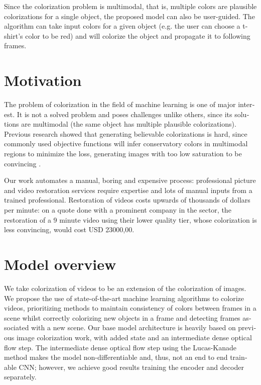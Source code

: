 \documentclass[12pt,openright,oneside,a4paper,english]{abntex2}
\begin{document}
\begin{otherlanguage}{english}
Since the colorization problem is multimodal, that is, multiple colors are plausible colorizations for a single object, the proposed model can also be user-guided. The algorithm can take input colors for a given object (e.g. the user can choose a t-shirt's color to be red) and will colorize the object and propagate it to following frames.

\section{Motivation} \label{sec:Motivation}
The problem of colorization in the field of machine learning is one of major interest. It is not a solved problem and poses challenges unlike others, since its solutions are multimodal (the same object has multiple plausible colorizations). Previous research showed that generating believable colorizations is hard, since commonly used objective functions will infer conservatory colors in multimodal regions to minimize the loss, generating images with too low saturation to be convincing \cite{colorful}.

Our work automates a manual, boring and expensive process: professional picture and video restoration services require expertise and lots of manual inputs from a trained professional. Restoration of videos costs upwards of thousands of dollars per minute: on a quote done with a prominent company in the sector, the restoration of a 9 minute video using their lower quality tier, whose colorization is less convincing, would cost USD 23000,00.

\section{Model overview}

We take colorization of videos to be an extension of the colorization of images. We propose the use of state-of-the-art machine learning algorithms to colorize videos, prioritizing methods to maintain consistency of colors between frames in a scene whilst correctly colorizing new objects in a frame and detecting frames associated with a new scene. Our base model architecture is heavily based on previous image colorization work, with added state and an intermediate dense optical flow step. The intermediate dense optical flow step using the Lucas-Kanade method makes the model non-differentiable and, thus, not an end to end trainable CNN; however, we achieve good results training the encoder and decoder separately.


\end{otherlanguage}
\end{document}
